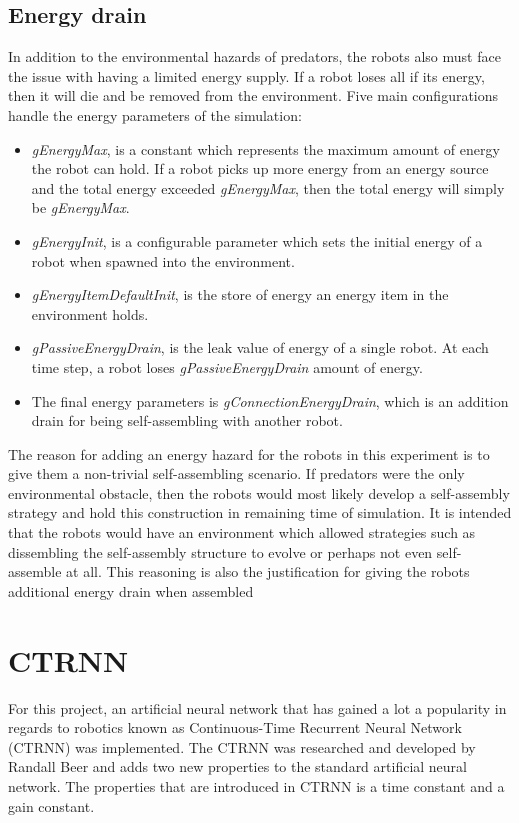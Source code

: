\subsection{Energy drain}
In addition to the environmental hazards of predators, the robots also must face the issue with having a limited energy supply.
If a robot loses all if its energy, then it will die and be removed from the environment.
Five main configurations handle the energy parameters of the simulation:

\begin{itemize}
	
	\item \emph{gEnergyMax}, is a constant which represents the maximum amount of energy the robot can hold.
	If a robot picks up more energy from an energy source and the total energy exceeded \emph{gEnergyMax}, then the total energy will simply be \emph{gEnergyMax}.
	
	\item \emph{gEnergyInit}, is a configurable parameter which sets the initial energy of a robot when spawned into the environment.
	
	\item \emph{gEnergyItemDefaultInit}, is the store of energy an energy item in the environment holds.
	
	\item \emph{gPassiveEnergyDrain}, is the leak value of energy of a single robot. At each time step, a robot loses \emph{gPassiveEnergyDrain} amount of energy.
	
	\item The final energy parameters is \emph{gConnectionEnergyDrain}, which is an addition drain for being self-assembling with another robot.
	
	
\end{itemize}


The reason for adding an energy hazard for the robots in this experiment is to give them a non-trivial self-assembling scenario.
If predators were the only environmental obstacle, then the robots would most likely develop a self-assembly strategy and hold this construction in remaining time of simulation.
It is intended that the robots would have an environment which allowed strategies such as dissembling the self-assembly structure to evolve or perhaps not even self-assemble at all.
This reasoning is also the justification for giving the robots additional energy drain when assembled

\section{CTRNN}
\label{sec:ctrnn}
For this project, an artificial neural network that has gained a lot a popularity in regards to robotics known as Continuous-Time Recurrent Neural Network (CTRNN) was implemented. 
The CTRNN was researched and developed by Randall Beer\cite{beer_dynamics_1997} and adds two new properties to the standard artificial neural network. 
The properties that are introduced in CTRNN is a time constant and a gain constant.

